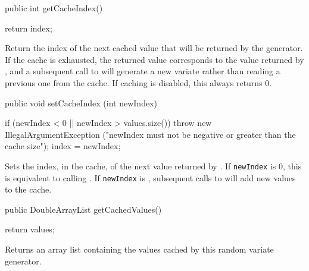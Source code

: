 \begin{code}

   public int getCacheIndex()\begin{hide} {
      return index;
   }\end{hide}
\end{code}
\begin{tabb}   Return the index of the next cached value that will be
 returned by the generator.
 If the cache is exhausted, the 
 returned value corresponds to the value returned by
 , and a subsequent call to
  will generate a new variate rather than
 reading a previous one from the cache.
 If caching is disabled, this always returns 0.
\end{tabb}
\begin{htmlonly}
\end{htmlonly}
\begin{code}

   public void setCacheIndex (int newIndex)\begin{hide} {
      if (newIndex < 0 || newIndex > values.size())
         throw new IllegalArgumentException
         ("newIndex must not be negative or greater than the cache size");
      index = newIndex;
   }\end{hide}
\end{code}
\begin{tabb}   Sets the index, in the cache, of the next value returned
 by .
 If \texttt{newIndex} is 0, this is equivalent to
 calling .
 If \texttt{newIndex} is ,
 subsequent calls to  will add
 new values to the cache.
\end{tabb}
\begin{htmlonly}
\end{htmlonly}
\begin{code}

   public DoubleArrayList getCachedValues()\begin{hide} {
      return values;
   }\end{hide}
\end{code}
\begin{tabb}   Returns an array list containing the values
 cached by this random variate generator.
\end{tabb}
